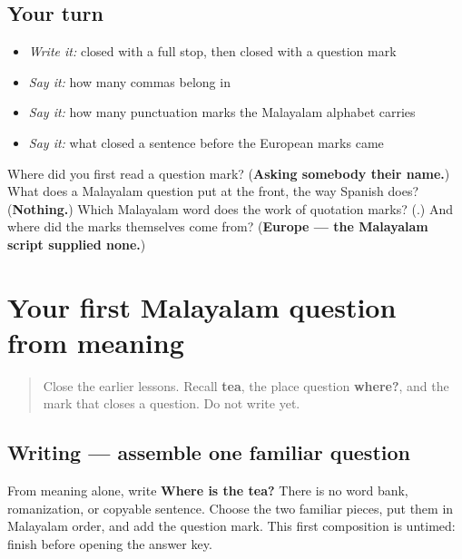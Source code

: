 \subsection*{Your turn}
\begin{itemize}
\raggedright
  \item \emph{Write it:} \textbf{ } closed with a full stop, then \textbf{  } closed with a question mark
  \item \emph{Say it:} how many commas belong in \textbf{  }
  \item \emph{Say it:} how many punctuation marks the Malayalam alphabet carries
  \item \emph{Say it:} what closed a sentence before the European marks came
\end{itemize}

\begin{tcolorbox}[breakable,colback=teal!4,colframe=teal!35!black,title={Before you move on}]
Where did you first read a question mark? (\textbf{Asking somebody their name.}) What does a Malayalam question put at the front, the way Spanish does? (\textbf{Nothing.}) Which Malayalam word does the work of quotation marks? (\textbf{}.) And where did the marks themselves come from? (\textbf{Europe — the Malayalam script supplied none.})
\end{tcolorbox}
\section[\texorpdfstring{\ml{ചായ} \ml{എവിടെ}? (cāya eviṭe?)}{ചായ എവിടെ? (cāya eviṭe?)}]{Your first Malayalam question from meaning}

\label{lesson:ML-W108-evide-controlled-question}



\begin{quote}
Close the earlier lessons. Recall \textbf{tea}, the place question \textbf{where?}, and the mark that closes a question. Do not write yet.
\end{quote}

\subsection*{Writing — assemble one familiar question}
From meaning alone, write \textbf{Where is the tea?} There is no word bank, romanization, or copyable sentence. Choose the two familiar pieces, put them in Malayalam order, and add the question mark. This first composition is untimed: finish before opening the answer key.

